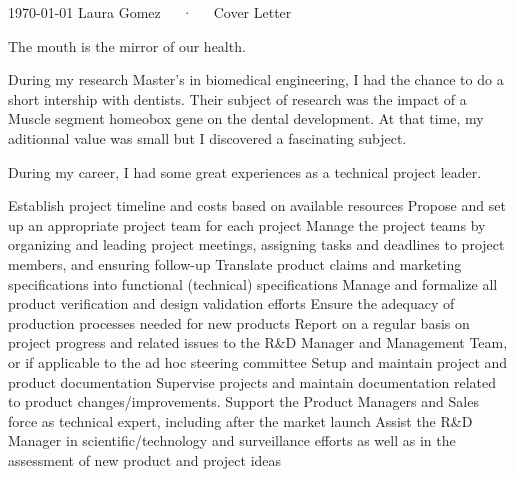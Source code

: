 \documentclass[11pt, a4paper]{awesome-cv}
\begin{document}
\makecvheader[R]

\makecvfooter
  {\today}
  {Laura Gomez~~~·~~~Cover Letter}
  {}

\makelettertitle

\begin{cvletter}


The mouth is the mirror of our health.

During my research Master's in biomedical engineering, I had the chance to do a short intership with dentists. 
Their subject of research was the impact of a Muscle segment homeobox gene on the dental development. 
At that time, my aditionnal value was small but I discovered a fascinating subject.

During my career, I had some great experiences as a technical project leader.


Establish project timeline and costs based on available resources
Propose and set up an appropriate project team for each project
Manage the project teams by organizing and leading project meetings, assigning tasks and deadlines
to project members, and ensuring follow-up
Translate product claims and marketing specifications into functional (technical) specifications
Manage and formalize all product verification and design validation efforts
Ensure the adequacy of production processes needed for new products
Report on a regular basis on project progress and related issues to the R\&D Manager and
Management Team, or if applicable to the ad hoc steering committee
Setup and maintain project and product documentation
Supervise projects and maintain documentation related to product changes/improvements.
Support the Product Managers and Sales force as technical expert, including after the market launch
Assist the R\&D Manager in scientific/technology and surveillance efforts as well as in the assessment
of new product and project ideas


\end{cvletter}


\makeletterclosing
\end{document}
